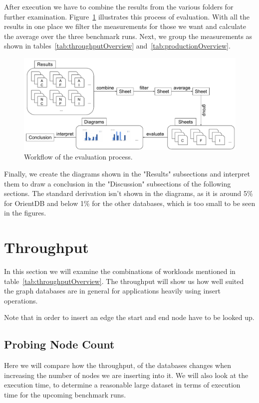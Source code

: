 After execution we have to combine the results from the various folders for further examination.
Figure~\ref{fig:evaluationWorkflow} illustrates this process of evaluation.
With all the results in one place we filter the measurements for those we want and calculate the average over the three benchmark runs.
Next,
we group the measurements as shown in tables~\ref{tab:throughputOverview} and~\ref{tab:productionOverview}.\\

\begin{figure}[!h]
  \includegraphics[width=\textwidth]{images/evaluationProcess}
  \caption{Workflow of the evaluation process.}
  \label{fig:evaluationWorkflow}
\end{figure}

Finally,
we create the diagrams shown in the "Results" subsections and interpret them to draw a conclusion in the "Discussion" subsections of the following sections.
The standard derivation isn't shown in the diagrams,
as it is around 5\% for OrientDB and below 1\% for the other databases,
which is too small to be seen in the figures.

\section{Throughput}
\label{ch:evaluation:se:throughput}
In this section we will examine the combinations of workloads mentioned in table~\ref{tab:throughputOverview}.
The throughput will show us how well suited the graph databases are in general for applications heavily using insert operations.

Note that in order to insert an edge the start and end node have to be looked up.

\subsection{Probing Node Count}
\label{ch:evaluation:se:probingNodeCount}
Here we will compare how the throughput,
of the databases changes when increasing the number of nodes we are inserting into it.
We will also look at the execution time,
to determine a reasonable large dataset in terms of execution time for the upcoming benchmark runs.

